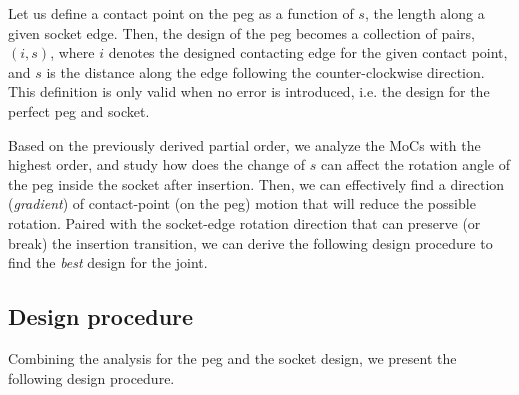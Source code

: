 \documentclass[letterpaper, 10 pt, conference]{ieeeconf}
\begin{document}
Let us define a contact point on the peg as a function of $s$, the length along a given socket edge. Then, the design of the peg becomes a collection of pairs, $(i, s)$, where $i$ denotes the designed contacting edge for the given contact point, and $s$ is the distance along the edge following the counter-clockwise direction. This definition is only valid when no error is introduced, i.e. the design for the perfect peg and socket. 

Based on the previously derived partial order, we analyze the MoCs with the highest order, and study how does the change of $s$ can affect the rotation angle of the peg inside the socket after insertion. Then, we can effectively find a direction ({\em gradient}) of contact-point (on the peg) motion that will reduce the possible rotation. Paired with the socket-edge rotation direction that can preserve (or break) the insertion transition, we can derive the following design procedure to find the {\em best} design for the joint. 

\subsection{Design procedure}

Combining the analysis for the peg and the socket design, we present the following design procedure. 
\end{document}
